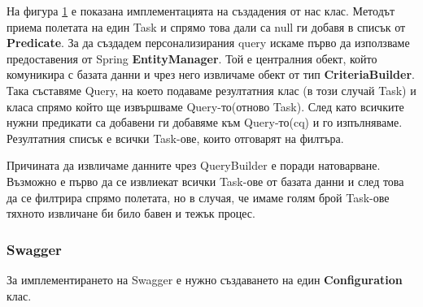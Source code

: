         \begin{figure}[h]
            \centering
            \caption{}
            \label{fig:custom_task_repository}
        \end{figure}
        
        На фигура \ref{fig:custom_task_repository} е показана имплементацията на създадения от нас клас. Методът приема полетата на един Task и спрямо това дали са null ги добавя в списък от \textbf{Predicate}. За да създадем персонализирания query искаме първо да използваме предоставения от Spring \textbf{EntityManager}. Той е централния обект, който комуникира с базата данни и чрез него извличаме обект от тип \textbf{CriteriaBuilder}. Така съставяме Query, на което подаваме резултатния клас (в този случай Task) и класа спрямо който ще извършваме Query-то(отново Task). След като всичките нужни предикати са добавени ги добавяме към Query-то(cq) и го изпълняваме.
        Резултатния списък е всички Task-ове, които отговарят на филтъра.
        
        Причината да извличаме данните чрез QueryBuilder е поради натоварване. Възможно е първо да се извлиекат всички Task-ове от базата данни и след това да се филтрира спрямо полетата, но в случая, че имаме голям брой Task-ове тяхното извличане би било бавен и тежък процес.
        
        \subsubsection{Swagger}
        За имплементирането на Swagger е нужно създаването на един \textbf{Configuration} клас.
        
        \begin{figure}[h]
            \centering
            \caption{}
            \label{fig:swagger_config}
        \end{figure}
        
